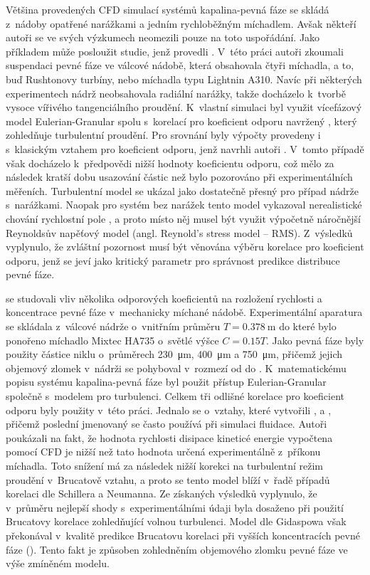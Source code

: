Většina provedených CFD simulací systémů kapalina-pevná fáze se skládá z~nádoby opatřené narážkami a jedním rychloběžným míchadlem. Avšak někteří autoři se ve svých výzkumech neomezili pouze na toto uspořádání. Jako příkladem může posloužit studie, jenž provedli \citet{mon04}. V~této práci autoři zkoumali suspendaci pevné fáze ve válcové nádobě, která obsahovala čtyři míchadla, a to, buď Rushtonovy turbíny, nebo míchadla typu Lightnin A310. Navíc při některých experimentech nádrž neobsahovala radiální narážky, takže docházelo k~tvorbě vysoce vířivého tangenciálního proudění. K~vlastní simulaci byl využit vícefázový model Eulerian-Granular spolu s~korelací pro koeficient odporu navržený \citet{pin01}, který zohledňuje turbulentní proudění. Pro srovnání byly výpočty provedeny i s~klasickým vztahem pro koeficient odporu, jenž navrhli autoři \citet{schi32}. V~tomto případě však docházelo k~předpovědi nižší hodnoty koeficientu odporu, což mělo za následek kratší dobu usazování částic než bylo pozorováno při experimentálních měřeních. Turbulentní model \keps{} se ukázal jako dostatečně přesný pro případ nádrže s~narážkami. Naopak pro systém bez narážek tento model vykazoval nerealistické chování rychlostní pole , a proto místo něj musel být využit výpočetně náročnější Reynoldsův napěťový model (angl. Reynold's stress model -- RMS). Z~výsledků vyplynulo, že zvláštní pozornost musí být věnována výběru korelace pro koeficient odporu, jenž se jeví jako kritický parametr pro správnost predikce distribuce pevné fáze.

\citet{ochi08} se studovali vliv několika odporových koeficientů na rozložení rychlosti a koncentrace pevné fáze v~mechanicky míchané nádobě. Experimentální aparatura se skládala z~válcové nádrže o~vnitřním průměru $T=\SI{0.378}{\meter}$ do které bylo ponořeno míchadlo Mixtec HA735 o~světlé výšce $C=\num{0.15}T$. Jako pevná fáze byly použity částice niklu o~průměrech \SI{230}{\micro\meter}, \SI{400}{\micro\meter} a \SI{750}{\micro\meter}, přičemž jejich objemový zlomek v~nádrži se pohyboval v~rozmezí od  do . K~matematickému popisu systému kapalina-pevná fáze byl použit přístup Eulerian-Granular společně s~modelem \keps{} pro turbulenci. Celkem tři odlišné korelace pro koeficient odporu byly použity v~této práci. Jednalo se o~vztahy, které vytvořili \citet{schi32}, \citet{bru98} a \citet{gid94}, přičemž poslední jmenovaný se často používá při simulaci fluidace. Autoři poukázali na fakt, že hodnota rychlosti disipace kineticé energie vypočtena pomocí CFD je nižší než tato hodnota určená experimentálně z~příkonu míchadla. Toto snížení má za následek nižší korekci na turbulentní režim proudění v~Brucatově vztahu, a proto se tento model blíží v~řadě případů korelaci dle Schillera a Neumanna. Ze získaných výsledků vyplynulo, že v~průměru nejlepší shody s~experimentálními údaji byla dosaženo při použití Brucatovy korelace zohledňující volnou turbulenci. Model dle Gidaspowa však překonával v~kvalitě predikce Brucatovu korelaci při vyšších koncentracích pevné fáze (). Tento fakt je způsoben zohledněním objemového zlomku pevné fáze ve výše zmíněném modelu.

